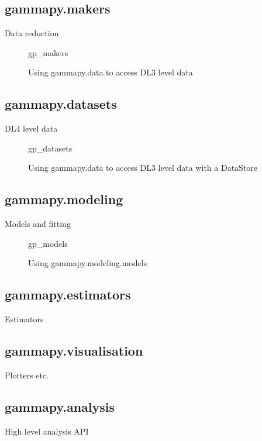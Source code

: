 \subsection{gammapy.makers}
\label{ssec:gammapy-makers}
Data reduction

\begin{figure}
	{gp_makers}

	\caption{Using gammapy.data to access DL3 level data}
	\label{ig*:minted:gp_makers}
\end{figure}

\subsection{gammapy.datasets}
\label{ssec:gammapy-datasets}
DL4 level data

\begin{figure}

	{gp_datasets}
	\caption{Using gammapy.data to access DL3 level data with a DataStore}
	\label{fig*:minted:gp_datasets}
\end{figure}

\subsection{gammapy.modeling}
\label{ssec:gammapy-modeling}
Models and fitting

\begin{figure}
	{gp_models}
	\caption{Using gammapy.modeling.models}
	\label{fig*:minted:gp_models}
\end{figure}

\subsection{gammapy.estimators}
\label{ssec:gammapy-estimators}
Estimators

\subsection{gammapy.visualisation}
\label{ssec:gammapy-visualisation}
Plotters etc.

\subsection{gammapy.analysis}
\label{ssec:gammapy-analysis}
High level analysis API

